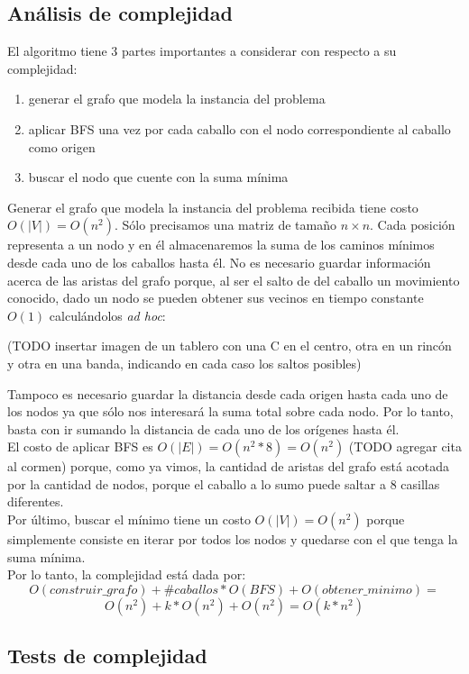 \subsection{Análisis de complejidad}
El algoritmo tiene 3 partes importantes a considerar con respecto a su complejidad:
\begin{enumerate}
  \item generar el grafo que modela la instancia del problema
  \item aplicar BFS una vez por cada caballo con el nodo correspondiente al caballo como origen
  \item buscar el nodo que cuente con la suma mínima
\end{enumerate}
Generar el grafo que modela la instancia del problema recibida tiene costo $O(\left\vert{V}\right\vert) = O(n^2)$. 
Sólo precisamos una matriz de tamaño $n \times n$. Cada posición representa a un nodo y en él almacenaremos la suma
de los caminos mínimos desde cada uno de los caballos hasta él. No es necesario guardar información acerca de las
aristas del grafo porque, al ser el salto de del caballo un movimiento conocido, dado un nodo se pueden obtener sus vecinos
en tiempo constante $O(1)$ calculándolos \textit{ad hoc}:
\begin{center}
(TODO insertar imagen de un tablero con una C en el centro, otra en un rincón y otra en una banda, indicando en cada
caso los saltos posibles)
\end{center}
Tampoco es necesario guardar la distancia desde cada origen hasta cada uno de los nodos ya que sólo nos interesará
la suma total sobre cada nodo. Por lo tanto, basta con ir sumando la distancia de cada uno de los orígenes hasta él.\\
El costo de aplicar BFS es $O(\left\vert{E}\right\vert) = O(n^2 * 8) = O(n^2)$ (TODO agregar cita al cormen) porque, 
como ya vimos, la cantidad de aristas del grafo está acotada por la cantidad de nodos, porque el caballo a lo sumo
puede saltar a 8 casillas diferentes.\\
Por último, buscar el mínimo tiene un costo $O(\left\vert{V}\right\vert) = O(n^2)$ porque simplemente consiste
en iterar por todos los nodos y quedarse con el que tenga la suma mínima.\\
Por lo tanto, la complejidad está dada por:
\begin{displaymath}
  O(construir\_grafo) + \#caballos * O(BFS) + O(obtener\_minimo) = 
\end{displaymath}
\begin{displaymath}
  O(n^2) + k * O(n^2) + O(n^2) = O(k * n^2)
\end{displaymath}

\subsection{Tests de complejidad}
